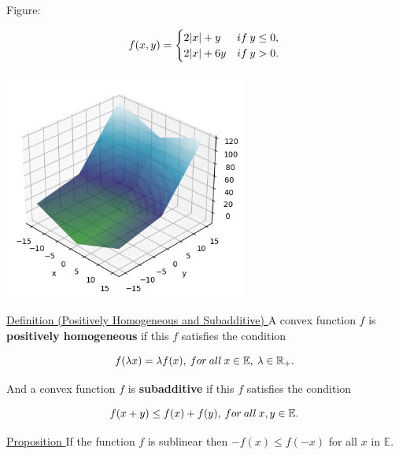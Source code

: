 \documentclass[a4paper,11pt]{jsarticle}
\begin{document}
Figure:

\begin{equation}
  f(x, y)=
  \begin{cases}
    2|x| + y & if\:y \leq 0, \\
    2|x| + 6y & if\:y > 0. \notag
  \end{cases}
\end{equation}

\begin{center}
  \includegraphics[width=8cm]{sublinear_output.png}
\end{center}

\begin{itembox}[l]{\underline{Definition (Positively Homogeneous and Subadditive) }}
  A convex function $f$ is \textbf{positively homogeneous} if this $f$ satisfies the condition

  \begin{equation}
    f(\lambda x) = \lambda f(x),\:for \:all\: x \in{\mathbb{E}},\: \lambda \in{\mathbb{R}}_+. \notag
  \end{equation}

  And a convex function $f$ is \textbf{subadditive} if this $f$ satisfies the condition

  \begin{equation}
    f( x + y) \leq f(x) + f(y),\:for \:all\: x, y \in{\mathbb{E}}. \notag
  \end{equation}
\end{itembox}

\begin{itembox}[l]{\underline{Proposition }}
  If the function $f$
  is sublinear then $-f(x) \leq f(-x)$ for all $x$ in $\mathbb{E}$.
\end{itembox}
\end{document}
